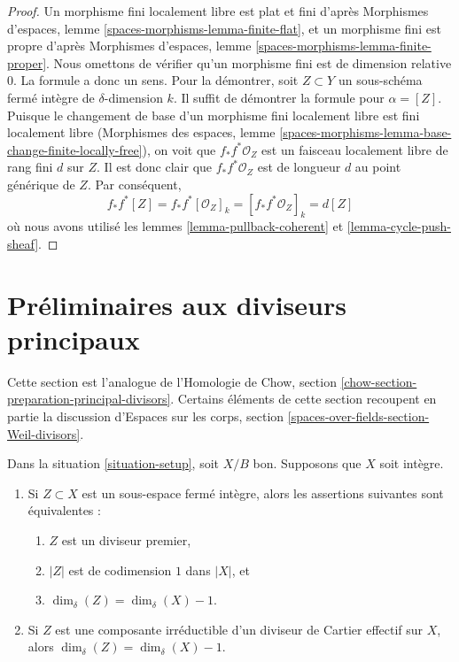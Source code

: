 \begin{proof}
Un morphisme fini localement libre est plat et fini d'après Morphismes
d'espaces, lemme \ref{spaces-morphisms-lemma-finite-flat}, et un morphisme
fini est propre d'après Morphismes d'espaces, lemme
\ref{spaces-morphisms-lemma-finite-proper}. Nous omettons de vérifier qu'un
morphisme fini est de dimension relative $0$. La formule a donc un sens. Pour
la démontrer, soit $Z \subset Y$ un sous-schéma fermé intègre de
$\delta$-dimension $k$. Il suffit de démontrer la formule pour
$\alpha = [Z]$. Puisque le changement de base d'un morphisme fini localement
libre est fini localement libre (Morphismes des espaces, lemme
\ref{spaces-morphisms-lemma-base-change-finite-locally-free}), on voit que
$f_*f^*\mathcal{O}_Z$ est un faisceau localement libre de rang fini $d$ sur
$Z$. Il est donc clair que $f_*f^*\mathcal{O}_Z$ est de longueur $d$ au point
générique de $Z$. Par conséquent,
$$
f_*f^*[Z] = f_*f^*[\mathcal{O}_Z]_k =
[f_*f^*\mathcal{O}_Z]_k = d[Z]
$$
où nous avons utilisé les lemmes \ref{lemma-pullback-coherent} et
\ref{lemma-cycle-push-sheaf}.
\end{proof}










\section{Préliminaires aux diviseurs principaux}
\label{section-preparation-principal-divisors}

\noindent
Cette section est l'analogue de l'Homologie de Chow, section
\ref{chow-section-preparation-principal-divisors}. Certains éléments de cette
section recoupent en partie la discussion d'Espaces sur les corps, section
\ref{spaces-over-fields-section-Weil-divisors}.

\begin{lemma}
\label{lemma-divisor-delta-dimension}
Dans la situation \ref{situation-setup}, soit $X/B$ bon. Supposons que
$X$ soit intègre.
\begin{enumerate}
\item Si $Z \subset X$ est un sous-espace fermé intègre, alors les assertions
suivantes sont équivalentes :
\begin{enumerate}
\item $Z$ est un diviseur premier,
\item $|Z|$ est de codimension $1$ dans $|X|$, et
\item $\dim_\delta(Z) = \dim_\delta(X) - 1$.
\end{enumerate}
\item Si $Z$ est une composante irréductible d'un diviseur de Cartier effectif
sur $X$, alors $\dim_\delta(Z) = \dim_\delta(X) - 1$.
\end{enumerate}
\end{lemma}

